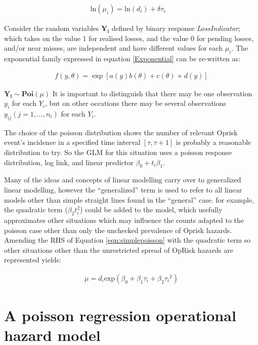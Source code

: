 \documentclass[]{article}
\begin{document}
\singlespacing

\begin{eqnarray}\label{eqn:simplepoisson}
\mbox{ln}(\mu_i) = \mbox{ln}(d_i) + \delta\tau_i \quad 
\end{eqnarray} \doublespacing

Consider the random variables \(\mathbf{Y_i}\) defined by binary
response \emph{LossIndicator}; which takes on the value \(1\) for
realised losses, and the value \(0\) for pending losses, and/or near
misses, are independent and have different values for each \(\mu_i\).
The exponential family expressed in equation \ref{Exponential} can be
re-written as:

\begin{eqnarray}
f(y,\theta) = \exp\left[a(y)b(\theta) + c(\theta) +d(y)\right]
\end{eqnarray}

\(\mathbf{Y_i} \sim \mathbf{Poi}(\mu)\) It is important to distinguish
that there may be one observation \(y_i\) for each \(Y_i\), but on other
occations there may be several observations \(y_{ij} (j=1,\ldots,n_i)\)
for each \(Y_i\).\medskip

The choice of the poisson distribution shows the number of relevant
Oprisk event's incidence in a specified time interval \([\tau,\tau+1]\)
is probably a reasonable distribution to try. So the GLM for this
situation uses a poisson response distribution, log link, and linear
predictor \(\beta_0 + t_i\beta_1\).\medskip

Many of the ideas and concepts of linear modelling carry over to
generalized linear modelling, however the ``generalized'' term is used
to refer to all linear models other than simple straight lines found in
the ``general'' case. for example, the quadratic term (\(\beta_2t_i^2\))
could be added to the model, which usefully approximates other
situations which may influence the counts adapted to the poisson case
other than only the unchecked prevalence of Oprisk hazards. Amending the
RHS of Equation \ref{eqn:simplepoisson} with the quadratic term so other
situations other than the unrestricted spread of OpRisk hazards are
represented yields:

\singlespacing

\begin{eqnarray}\label{eqn:adaptedpoisson}
\mu = d_i\mbox{exp}(\beta_0 + \beta_1\tau_i + \beta_2{\tau_i}^2) 
\end{eqnarray} \doublespacing

\section{A poisson regression operational hazard model}
\label{sec:A poisson regression operational hazard model}
\end{document}
